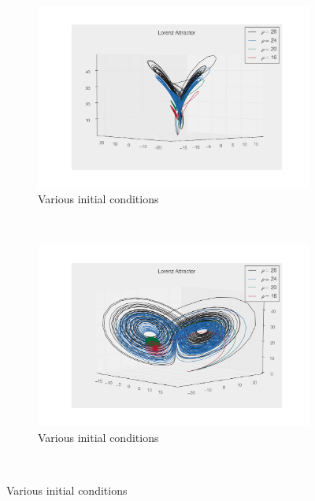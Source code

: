 \documentclass[paper=a4, fontsize=11pt, abstract=on]{scrartcl} %
\numberwithin{equation}{section}
\numberwithin{figure}{section}
\numberwithin{table}{section}
\begin{document}
\begin{figure}
        \centering
        \begin{subfigure}[b]{0.5\textwidth}
                \includegraphics[width=\textwidth]{lorenz1}
                \caption{Various initial conditions}
                \label{fig:lorenza}
        \end{subfigure}%
        ~ %
        \begin{subfigure}[b]{0.5\textwidth}
                \includegraphics[width=\textwidth]{lorenz_z0}
                \caption{Various initial conditions}
                \label{fig:lorenzb}
        \end{subfigure}
        ~ %

\end{figure}
\end{document}
